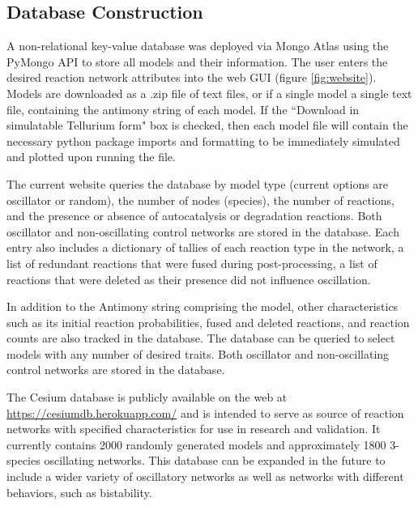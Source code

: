 \documentclass[12pt]{report}
\begin{document}
\subsection{Database Construction}
A non-relational key-value database was deployed via Mongo Atlas using the PyMongo API to store all models and their information. The user enters the desired reaction network attributes into the web GUI (figure \ref{fig:website}). Models are downloaded as a .zip file of text files, or if a single model a single text file, containing the antimony string of each model. If the ``Download in simulatable Tellurium form" box is checked, then each model file will contain the necessary python package imports and formatting to be immediately simulated and plotted upon running the file.


The current website queries the database by model type (current options are oscillator or random), the number of nodes (species), the number of reactions, and the presence or absence of autocatalysis or degradation reactions. Both oscillator and non-oscillating control networks are stored in the database. Each entry also includes a dictionary of tallies of each reaction type in the network, a list of redundant reactions that were fused during post-processing, a list of reactions that were deleted as their presence did not influence oscillation. 




In addition to the Antimony string comprising the model, other characteristics such as its initial reaction probabilities, fused and deleted reactions, and reaction counts are also tracked in the database.  The database can be queried to select models with any number of desired traits. Both oscillator and non-oscillating control networks are stored in the database.

The Cesium database is publicly available on the web at \url{https://cesiumdb.herokuapp.com/} and is intended to serve as source of reaction networks with specified characteristics for use in research and validation.  It currently contains 2000 randomly generated models and approximately 1800 3-species oscillating networks. This database can be expanded in the future to include a wider variety of oscillatory networks as well as networks with different behaviors, such as bistability. 
\end{document}
